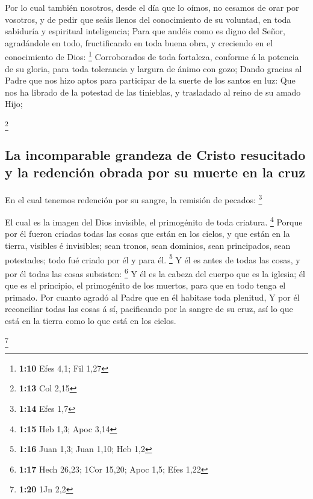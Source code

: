  Por lo cual también nosotros, desde el día que lo oímos, no
cesamos de orar por vosotros, y de pedir que seáis llenos del
conocimiento de su voluntad, en toda sabiduría y espiritual
inteligencia;  Para que andéis como es digno del Señor,
agradándole en todo, fructificando en toda buena obra, y creciendo en el
conocimiento de Dios: \footnote{\textbf{1:10} Efes 4,1; Fil 1,27}
 Corroborados de toda fortaleza, conforme á la potencia de
su gloria, para toda tolerancia y largura de ánimo con gozo;
 Dando gracias al Padre que nos hizo aptos para participar
de la suerte de los santos en luz:  Que nos ha librado de
la potestad de las tinieblas, y trasladado al reino de su amado Hijo;

\footnote{\textbf{1:13} Col 2,15}

\hypertarget{la-incomparable-grandeza-de-cristo-resucitado-y-la-redenciuxf3n-obrada-por-su-muerte-en-la-cruz}{%
\subsection{La incomparable grandeza de Cristo resucitado y la redención
obrada por su muerte en la
cruz}\label{la-incomparable-grandeza-de-cristo-resucitado-y-la-redenciuxf3n-obrada-por-su-muerte-en-la-cruz}}

 En el cual tenemos redención por su sangre, la remisión de
pecados: \footnote{\textbf{1:14} Efes 1,7}

 El cual es la imagen del Dios invisible, el primogénito de
toda criatura. \footnote{\textbf{1:15} Heb 1,3; Apoc 3,14} 
Porque por él fueron criadas todas las cosas que están en los cielos, y
que están en la tierra, visibles é invisibles; sean tronos, sean
dominios, sean principados, sean potestades; todo fué criado por él y
para él. \footnote{\textbf{1:16} Juan 1,3; Juan 1,10; Heb 1,2}
 Y él es antes de todas las cosas, y por él todas las cosas
subsisten: \footnote{\textbf{1:17} Hech 26,23; 1Cor 15,20; Apoc 1,5;
  Efes 1,22}  Y él es la cabeza del cuerpo que es la
iglesia; él que es el principio, el primogénito de los muertos, para que
en todo tenga el primado.  Por cuanto agradó al Padre que
en él habitase toda plenitud,  Y por él reconciliar todas
las cosas á sí, pacificando por la sangre de su cruz, así lo que está en
la tierra como lo que está en los cielos.

\footnote{\textbf{1:20} 1Jn 2,2}

